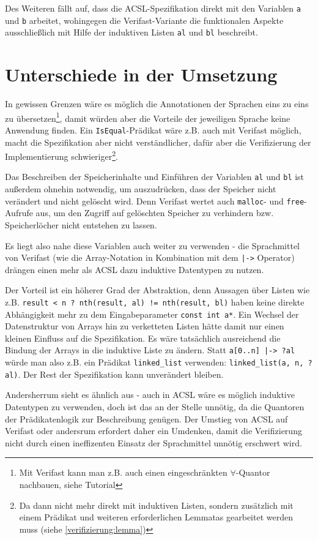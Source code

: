 Des Weiteren fällt auf, dass die ACSL-Spezifikation direkt mit den Variablen \lstinline{a} und
\lstinline{b} arbeitet, wohingegen die Verifast-Variante die funktionalen Aspekte ausschließlich
mit Hilfe der induktiven Listen \lstinline{al} und \lstinline{bl} beschreibt. 


\section{Unterschiede in der Umsetzung}

In gewissen Grenzen wäre es möglich die Annotationen der Sprachen eins zu eins zu übersetzen\footnote{Mit
Verifast kann man z.B. auch einen eingeschränkten \(\forall\)-Quantor nachbauen, siehe Tutorial\cite[Kap. 17]{jacobs-tutorial}},
damit würden aber die Vorteile der jeweiligen Sprache keine Anwendung finden. Ein \lstinline{IsEqual}-Prädikat wäre z.B.
auch mit Verifast möglich, macht die Spezifikation aber nicht verständlicher, dafür aber die Verifizierung
der Implementierung schwieriger\footnote{Da dann nicht mehr direkt mit induktiven Listen, sondern zusätzlich
mit einem Prädikat und weiteren erforderlichen Lemmatas gearbeitet werden muss (siehe \ref{verifizierung:lemma})}.

Das Beschreiben der Speicherinhalte und Einführen der Variablen  \lstinline{al} und \lstinline{bl} ist außerdem
ohnehin notwendig, um auszudrücken, dass der Speicher nicht verändert und nicht gelöscht wird. Denn Verifast wertet
auch \lstinline{malloc}- und \lstinline{free}-Aufrufe aus, um den Zugriff auf gelöschten Speicher zu verhindern bzw.
Speicherlöcher nicht entstehen zu lassen.

Es liegt also nahe diese Variablen auch weiter zu verwenden - die Sprachmittel von Verifast (wie die Array-Notation in Kombination mit dem
\lstinline{|->} Operator) drängen einen mehr als ACSL dazu induktive Datentypen zu nutzen.

Der Vorteil ist ein höherer Grad der Abstraktion, denn Aussagen über Listen wie z.B.
\lstinline{result < n ? nth(result, al) != nth(result, bl)} haben keine direkte Abhängigkeit mehr zu
dem Eingabeparameter \lstinline{const int a*}. Ein Wechsel der Datenstruktur von Arrays
hin zu verketteten Listen hätte damit nur einen kleinen Einfluss auf die Spezifikation. Es wäre tatsächlich 
ausreichend die Bindung der Arrays in die induktive Liste zu ändern. Statt \lstinline{a[0..n] |-> ?al} würde man also
z.B. ein Prädikat \lstinline{linked_list} verwenden: \lstinline{linked_list(a, n, ?al)}. Der Rest der 
Spezifikation kann unverändert bleiben.

Andersherrum sieht es ähnlich aus - auch in ACSL wäre es möglich induktive Datentypen zu verwenden, doch
ist das an der Stelle unnötig, da die Quantoren der Prädikatenlogik zur Beschreibung genügen. 
Der Umstieg von ACSL auf Verifast oder andersrum erfordert daher ein Umdenken, damit die Verifizierung 
nicht durch einen ineffizenten Einsatz der Sprachmittel unnötig erschwert wird.


